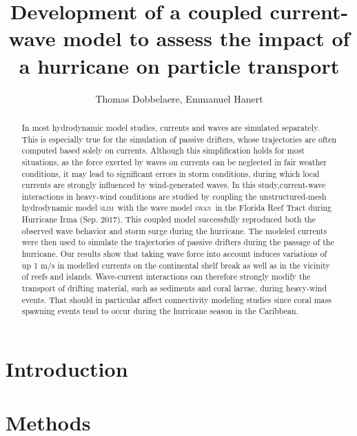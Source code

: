 \documentclass[11pt,a4paper]{article}
\title{Development of a coupled current-wave model to assess the impact of a hurricane on particle transport}
\author{Thomas Dobbelaere, Emmanuel Hanert}
\newcommand{\slim}{\textsc{slim}\ }
\newcommand{\swan}{\textsc{swan}\ }
\begin{document}
\maketitle
\begin{abstract}
In most hydrodynamic model studies, currents and waves are simulated separately. This is especially true for the simulation of passive drifters, whose trajectories are often computed based solely on currents. Although this simplification holds for most situations, as the force exerted by waves on currents can be neglected in fair weather conditions, it may lead to significant errors in storm conditions, during which local currents are strongly influenced by wind-generated waves. In this study,current-wave interactions in heavy-wind conditions  are studied by coupling the unstructured-mesh hydrodynamic model \slim with the wave model \swan in the Florida Reef Tract during Hurricane Irma (Sep. 2017). This coupled model successfully reproduced both the observed wave behavior and storm surge during the hurricane. The modeled currents were then used to simulate the trajectories of passive drifters during the passage of the hurricane. Our results show that taking wave force into account induces  variations of up 1 m/s in modelled currents on the continental shelf break as well as in the vicinity of  reefs and islands. Wave-current interactions can therefore strongly modify  the transport of drifting material, such as sediments and coral larvae, during heavy-wind events. That should in particular affect connectivity modeling studies since coral mass spawning events tend to occur during the hurricane season in the Caribbean.

\end{abstract}

\section{Introduction}


\section{Methods}
\end{document}
